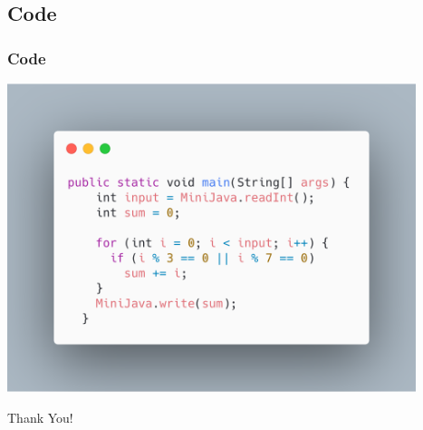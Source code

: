 \documentclass[handout, navsym]{tum-presentation}
\numberwithin{equation}{section}
\begin{document}
\subsection{Code}
\begin{frame}[fragile]
\frametitle{Code}

\center \includegraphics[height=9cm]{p4-code.png}

\end{frame}

\begin{frame}[fragile]
\vspace*{\fill} 
\begin{center}
 \Huge Thank You!
\end{center}
\vspace*{\fill} 
\end{frame}
\end{document}
